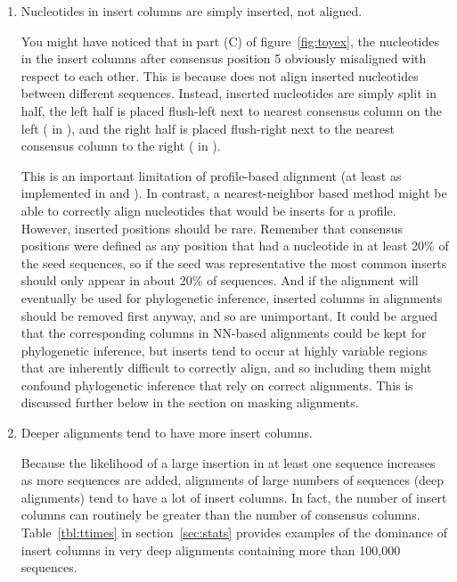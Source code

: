\begin{enumerate}
\item 
Nucleotides in insert columns are simply inserted, not aligned.

You might have noticed that in part (C) of figure~\ref{fig:toyex}, the
nucleotides in the insert columns after consensus position 5 obviously
misaligned with respect to each other. This is because 
does not align inserted nucleotides between different
sequences. Instead, inserted nucleotides are simply split in half, the
left half is placed flush-left next to nearest consensus column on the
left ( in ), and the right half is placed
flush-right next to the nearest consensus column to the right
( in ). 

This is an important limitation of
profile-based alignment (at least as implemented in  and
). In contrast, a nearest-neighbor based method might
be able to correctly align nucleotides that would be inserts for a
profile. However, inserted positions should be rare. Remember that
consensus positions were defined as any position that had a nucleotide
in at least 20\% of the seed sequences, so if the seed was
representative the most common inserts should only appear in about
20\% of sequences. And if the alignment will eventually be used for
phylogenetic inference, inserted columns in  alignments
should be removed first anyway, and so are unimportant. 
It could be argued that the corresponding columns in NN-based
alignments could be kept for phylogenetic inference, but inserts tend
to occur at highly variable regions that are inherently difficult to
correctly align, and so including them might confound phylogenetic
inference that rely on correct alignments. This is
discussed further below in the section on masking alignments.

\item 
Deeper alignments tend to have more insert columns. 

Because the likelihood of a large insertion in at least one sequence
increases as more sequences are added, alignments of large numbers of
sequences (deep alignments) tend to have a lot of insert columns. In
fact, the number of insert columns can routinely be greater than the
number of consensus columns.  Table~\ref{tbl:ttimes} in
section~\ref{sec:stats} provides examples of the dominance of insert
columns in very deep alignments containing more than 100,000
sequences.

\end{enumerate} 

